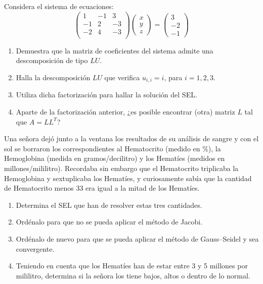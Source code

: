 \documentclass[12pt]{article}
\begin{document}
	\begin{ejercicio}
		Considera el sistema de ecuaciones:
		$$ \begin{pmatrix}
			1 & -1 & 3 \\
			-1 & 2 & -3 \\
			-2 & 4 & -3 \\
		\end{pmatrix} 
		\begin{pmatrix}
			x \\
			y \\
			z
		\end{pmatrix} = 
		\begin{pmatrix}
			3 \\
			-2 \\
			-1
		\end{pmatrix}$$
		
		\begin{enumerate}[label=\alph*)] 
			\item Demuestra que la matriz de coeficientes del sistema admite una descomposición de tipo $LU$.
			
			\item Halla la descomposición $LU$ que verifica $u_{i,i} = i$, para $i = 1, 2, 3$.
			
			\item Utiliza dicha factorización para hallar la solución del SEL.
			
			\item Aparte de la factorización anterior, ¿es posible encontrar (otra) matriz $L$ tal que $A = L L^T$?
		\end{enumerate}
	\end{ejercicio}
	
	\begin{ejercicio}
		Una señora dejó junto a la ventana los resultados de su análisis de sangre y con el sol se borraron los correspondientes al Hematocrito (medido en \%), la Hemoglobina (medida en gramos/decilitro) y los Hematíes (medidos en millones/mililitro). Recordaba sin embargo que el Hematocrito triplicaba la Hemoglobina y sextuplicaba los Hematíes, y curiosamente sabía que la cantidad de Hematocrito menos 33 era igual a la mitad de los Hematíes.
		
		\begin{enumerate}[label=\alph*)] 
			\item Determina el SEL que han de resolver estas tres cantidades.
			
			\item Ordénalo para que no se pueda aplicar el método de Jacobi.
			
			\item Ordénalo de nuevo para que se pueda aplicar el método de Gauss–Seidel y sea convergente.
			
			\item Teniendo en cuenta que los Hematíes han de estar entre 3 y 5 millones por mililitro, determina si la
			señora los tiene bajos, altos o dentro de lo normal.
		\end{enumerate}
	\end{ejercicio}
	
\end{document}
